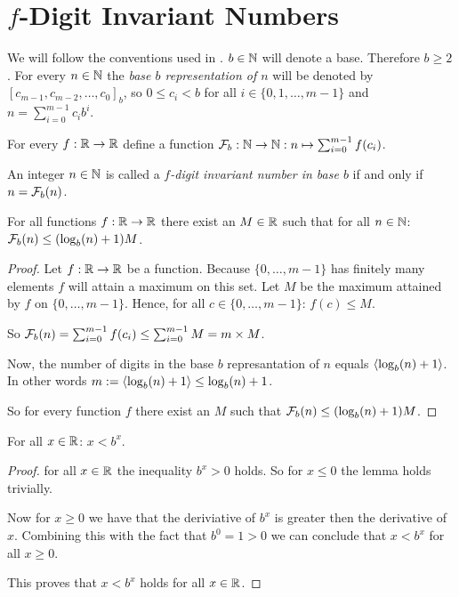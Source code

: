 \section*{$f$-Digit Invariant Numbers}

We will follow the conventions used in \cite{dvb}. $b\in\mathbb{N}$ will denote a base.
Therefore $b \ge 2$. For every $n \in \mathbb{N}$ the \emph{base $b$ representation
of $n$} will be denoted by $[c_{m-1}, c_{m-2}, \ldots, c_{0}]_{b}$, so 
$0 \le c_{i} < b$ for all $i \in \{0,1,\ldots,m-1\}$ and 
$n = \sum_{i=0}^{m-1} c_{i}b^{i}$.

For every $f : \mathbb{R} \rightarrow \mathbb{R}$ define a function $\mathcal{F}_{b} : \mathbb{N} \rightarrow
\mathbb{N} : n \mapsto \sum_{i=0}^{m-1} f(c_{i})$.

\begin{definition}
	An integer $n \in \mathbb{N}$ is called a \emph{$f$-digit invariant number in base
	$b$} if and only if $n = \mathcal{F}_{b}(n)$.
\end{definition}


\begin{proposition}
	For all functions $f : \mathbb{R} \rightarrow \mathbb{R}$ there exist an 
	$M \in \mathbb{R}$ such that for all $n \in \mathbb{N}$: $\mathcal{F}_{b}(n) \le (\log_{b}(n) + 1) M$.
\end{proposition}

\begin{proof}
	Let $f : \mathbb{R} \rightarrow \mathbb{R}$ be a function. Because $\{0,\ldots,m-1\}$ has 
	finitely many elements $f$ will attain a maximum on this set. Let $M$ be the
	maximum	attained by $f$ on $\{0,\ldots,m-1\}$. Hence, for all 
	$c \in \{0,\ldots,m-1\}$: $f(c) \le M$.
	
	So $\mathcal{F}_{b}(n) = \sum_{i=0}^{m-1} f(c_{i}) \le 
	\sum_{i=0}^{m-1} M = m \times M$.
	
	Now, the number of digits in the base $b$ represantation of $n$ equals 
	$\langle\log_{b}(n) + 1\rangle$. In other words $m := \langle\log_{b}(n) + 1\rangle 
	\le \log_{b}(n) + 1$.
	
	So for every function $f$ there exist an $M$ such that 
	$\mathcal{F}_{b}(n) \le (\log_{b}(n) + 1) M$.
\end{proof}

\begin{lemma}
	For all $x \in \mathbb{R}$: $x < b^{x}$.
\end{lemma}

\begin{proof}
	for all $x \in \mathbb{R}$ the inequality $b^{x} \gt 0$ holds. So for $x \le 0$ the
	lemma holds trivially.
	
	Now for $x \ge 0$ we have that the deriviative of $b^{x}$ is greater then
	the derivative of $x$. Combining this with the fact that $b^{0} = 1 > 0$ we
	can conclude that $x \lt b^{x}$ for all $x \ge 0$.
	
	This proves that $x < b^{x}$ holds for all $x \in \mathbb{R}$.
\end{proof}

